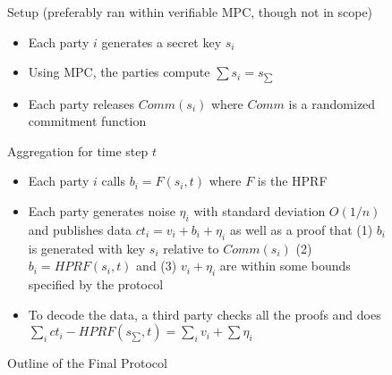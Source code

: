 \documentclass[11pt]{article}
\begin{document}
\begin{figure}
	\begin{mdframed}
		Setup (preferably ran within verifiable MPC, though not in scope) \begin{itemize}
			\item Each party $i$ generates a secret key $s_i$
			\item Using MPC, the parties compute $\sum s_i = s_{\sum}$
			\item Each party releases $Comm(s_i)$ where $Comm$ is a randomized commitment function
		\end{itemize}
		Aggregation for time step $t$ \begin{itemize}
			\item Each party $i$ calls $b_i = F(s_i, t)$  where $F$ is the HPRF
			\item Each party generates noise $\eta_i$ with standard deviation $O(1/n)$ and publishes data $ct_i = v_i + b_i + \eta_i$ as well as a proof that (1) $b_i$ is generated with key $s_i$ relative to $Comm(s_i)$ (2) $b_i = HPRF(s_i, t)$ and (3) $v_i + \eta_i$ are within some bounds specified by the protocol
			\item To decode the data, a third party checks all the proofs and does $\sum_i ct_i - HPRF(s_{\sum}, t) = \sum_i v_i + \sum \eta_i$
		\end{itemize}
	\end{mdframed}
	\caption{Outline of the Final Protocol}
	\label{fig:prot}
\end{figure}




\end{document}
